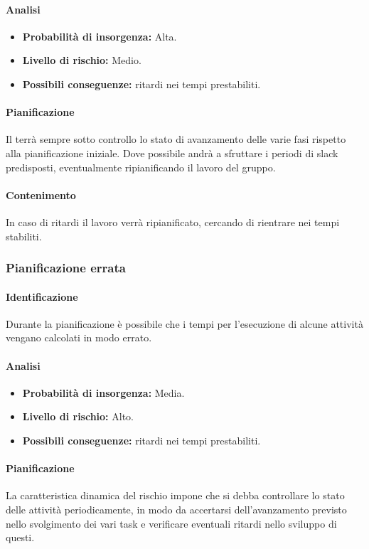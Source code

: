 \paragraph {Analisi}
\begin{itemize}
	\item \textbf{Probabilità di insorgenza:} Alta.
	\item \textbf{Livello di rischio:} Medio.
	\item \textbf{Possibili conseguenze:} ritardi nei tempi prestabiliti.
\end{itemize}

\paragraph {Pianificazione}
Il \RdP{} terrà sempre sotto controllo lo stato di avanzamento delle varie fasi rispetto alla pianificazione iniziale. Dove possibile andrà a sfruttare i periodi di slack predisposti, eventualmente ripianificando il lavoro del gruppo.

\paragraph {Contenimento}
In caso di ritardi il lavoro verrà ripianificato, cercando di rientrare nei tempi stabiliti.

\subsubsection{Pianificazione errata}
\paragraph {Identificazione}
Durante la pianificazione è possibile che i tempi per l'esecuzione di alcune attività vengano calcolati in modo errato.

\paragraph {Analisi}
\begin{itemize}
	\item \textbf{Probabilità di insorgenza:} Media.
	\item \textbf{Livello di rischio:} Alto.
	\item \textbf{Possibili conseguenze:} ritardi nei tempi prestabiliti.
\end{itemize}

\paragraph {Pianificazione}
La caratteristica dinamica del rischio impone che si debba controllare lo stato delle attività periodicamente, in modo da accertarsi dell'avanzamento previsto nello svolgimento dei vari task e verificare eventuali ritardi nello sviluppo di questi.

